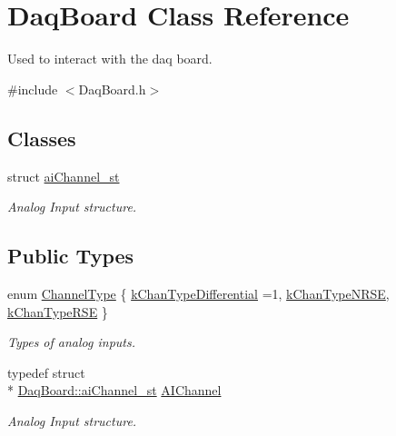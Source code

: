 \hypertarget{class_daq_board}{\section{Daq\-Board Class Reference}
\label{class_daq_board}
}


Used to interact with the daq board.  




{\ttfamily \#include $<$Daq\-Board.\-h$>$}

\subsection*{Classes}
\begin{DoxyCompactItemize}
\item 
struct \hyperlink{struct_daq_board_1_1ai_channel__st}{ai\-Channel\-\_\-st}
\begin{DoxyCompactList}\small\item\em Analog Input structure. \end{DoxyCompactList}\end{DoxyCompactItemize}
\subsection*{Public Types}
\begin{DoxyCompactItemize}
\item 
enum \hyperlink{class_daq_board_adc04f1440c6e392e2c5da2340b9da420}{Channel\-Type} \{ \hyperlink{class_daq_board_adc04f1440c6e392e2c5da2340b9da420a7143906b2b10a38ef0ffb592fe59f644}{k\-Chan\-Type\-Differential} =1, 
\hyperlink{class_daq_board_adc04f1440c6e392e2c5da2340b9da420a9575eb0c9b9d0c904bc55203db2ad2f2}{k\-Chan\-Type\-N\-R\-S\-E}, 
\hyperlink{class_daq_board_adc04f1440c6e392e2c5da2340b9da420adf2d9ac3fe1e4866ba5166052d751e16}{k\-Chan\-Type\-R\-S\-E}
 \}
\begin{DoxyCompactList}\small\item\em Types of analog inputs. \end{DoxyCompactList}\item 
\hypertarget{class_daq_board_a71c2d161d06f7c013aa1baa14c05a465}{typedef struct \\*
\hyperlink{struct_daq_board_1_1ai_channel__st}{Daq\-Board\-::ai\-Channel\-\_\-st} \hyperlink{class_daq_board_a71c2d161d06f7c013aa1baa14c05a465}{A\-I\-Channel}}\label{class_daq_board_a71c2d161d06f7c013aa1baa14c05a465}

\begin{DoxyCompactList}\small\item\em Analog Input structure. \end{DoxyCompactList}\end{DoxyCompactItemize}
